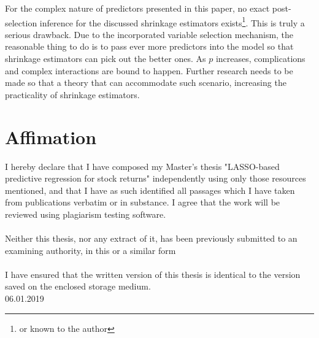 \documentclass[12pt,a4paper]{article}
\begin{document}
For the complex nature of predictors presented in this paper, no exact post-selection inference for the discussed shrinkage estimators exists\footnote{or known to the author}. This is truly a serious drawback. Due to the incorporated variable selection mechanism, the reasonable thing to do is to pass ever more predictors into the model so that shrinkage estimators can pick out the better ones. As $ p $ increases, complications and complex interactions are bound to happen. Further research needs to be made so that a theory that can accommodate such scenario, increasing the practicality of shrinkage estimators.




\newpage
\section*{Affimation}

I hereby declare that I have composed my Master's thesis "LASSO-based predictive regression for stock returns" independently using only those resources mentioned, and that I have as such identified all passages which I have taken from publications verbatim or in substance. I agree that the work will be reviewed using plagiarism testing software.
\\~\\
Neither this thesis, nor any extract of it, has been previously submitted to an examining authority, in this or a similar form
\\~\\
I have ensured that the written version of this thesis is identical to the version saved on the enclosed storage medium.
\\[2in]
06.01.2019
\end{document}

